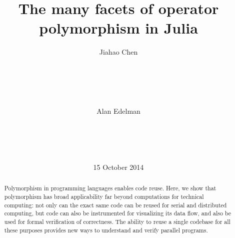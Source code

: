 \documentclass{sig-alternate}
\begin{document}
%

\title{The many facets of operator polymorphism in Julia}


\author{
\alignauthor
Jiahao Chen\\
       \\
       \\
       \\
       \\
       \\
\alignauthor
Alan Edelman\\
       \\
       \\
       \\
       \\
}

\date{15 October 2014}

\maketitle

\begin{abstract}
Polymorphism in programming languages enables code reuse. Here, we show that
polymorphism has broad applicability far beyond computations for technical
computing: not only can the exact same code can be reused for serial and
distributed computing, but code can also be instrumented for visualizing its
data flow, and also be used for formal verification of correctness.  The
ability to reuse a single codebase for all these purposes provides new
ways to understand and verify parallel programs.
\end{abstract}

\end{document}
